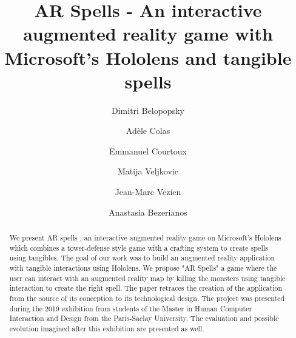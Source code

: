 \documentclass[sigchi, authorversion, screen]{acmart}
\begin{document}
%
\title{AR Spells - An interactive augmented reality game with Microsoft's Hololens and tangible spells}

%
\author{Dimitri Belopopsky}

\author{Adèle Colas}

\author{Emmanuel Courtoux}

\author{Matija Veljkovic}

\author{Jean-Marc Vezien}

\author{Anastasia Bezerianos}



%
\renewcommand{\shortauthors}{AR Spells}

%
\begin{abstract}
We present AR spells \cite{github-project}, an interactive augmented reality game on Microsoft’s Hololens which combines a tower-defense style game with a crafting system to create spells using tangibles. The goal of our work was to build an augmented reality application with tangible interactions using Hololens. We propose "AR Spells" a game where the user can interact with an augmented reality map by killing the monsters using tangible interaction to create the right spell. The paper retraces the creation of the application from the source of its conception to its technological design. The project was presented during the 2019 exhibition from students of the Master in Human Computer Interaction and Design from the Paris-Saclay University. The evaluation and possible evolution imagined after this exhibition are presented as well.

\end{abstract}
\end{document}

